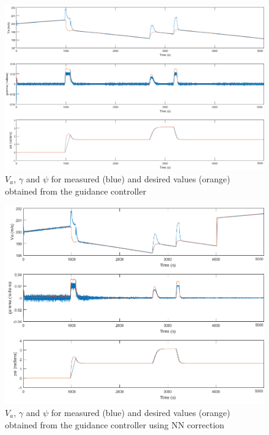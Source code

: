 \begin{figure}[h]
\centering
\includegraphics[width=1.15\textwidth]{Figures/Results/guidance_ref.png}
\caption[Reference following of $V_a$, $\gamma$ and $\psi$ from guidance controller]{$V_a$, $\gamma$ and $\psi$ for measured (blue) and desired values (orange) obtained from the guidance controller}
\label{fig:guidance_ref}
\end{figure}

\begin{figure}[h]
\centering
\includegraphics[width=1.15\textwidth]{Figures/Results/guidance_ref_NN.png}
\caption[Reference following of $V_a$, $\gamma$ and $\psi$ from guidance controller with NN correction]{$V_a$, $\gamma$ and $\psi$ for measured (blue) and desired values (orange) obtained from the guidance controller using NN correction}
\label{fig:guidance_ref_NN}
\end{figure}

